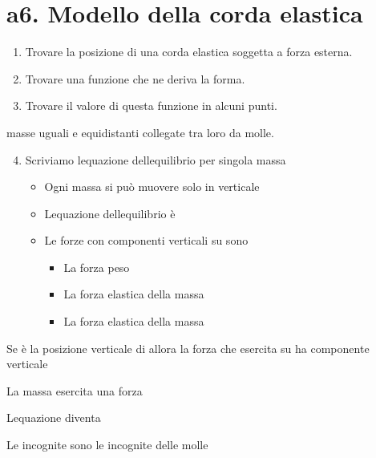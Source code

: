\documentclass[
]{article}
\providecommand{\tightlist}{%
  \setlength{\itemsep}{0pt}\setlength{\parskip}{0pt}}
\begin{document}
\hypertarget{a6.-modello-della-corda-elastica}{%
\section{a6. Modello della corda
elastica}\label{a6.-modello-della-corda-elastica}}

\begin{enumerate}
\tightlist
\item
  Trovare la posizione di una corda elastica soggetta a forza esterna.
\item
  Trovare una funzione che ne deriva la forma.
\item
  Trovare il valore di questa funzione in alcuni punti.
\end{enumerate}

{} masse uguali e equidistanti collegate tra loro da molle.

\begin{enumerate}
\setcounter{enumi}{3}
\tightlist
\item
  Scriviamo l\textquotesingle equazione dell\textquotesingle equilibrio
  per singola massa

  \begin{itemize}
  \tightlist
  \item
    Ogni massa si può muovere solo in verticale
  \item
    L\textquotesingle equazione dell\textquotesingle equilibrio è {}
  \item
    Le forze con componenti verticali su {} sono

    \begin{itemize}
    \tightlist
    \item
      La forza peso
    \item
      La forza elastica della massa {}
    \item
      La forza elastica della massa {}
    \end{itemize}
  \end{itemize}
\end{enumerate}

{}

Se {} è la posizione verticale di {} allora la forza che {} esercita su
{} ha componente verticale {}

La massa {} esercita una forza {}

L\textquotesingle equazione diventa

Le incognite sono {} le incognite delle molle\\
{}
\end{document}
